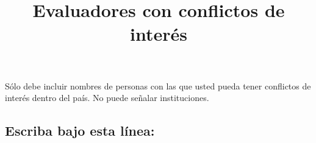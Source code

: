 \documentclass[10pt,prl]{revtex4}
\begin{document}
\title{Evaluadores con conflictos de inter\'es}
\maketitle


S\'olo debe incluir nombres de personas con las que usted pueda tener conflictos de inter\'es dentro del pa\'is. No puede se\~nalar instituciones.

\maketitle
\subsection{Escriba bajo esta l\'inea:}
\end{document}
